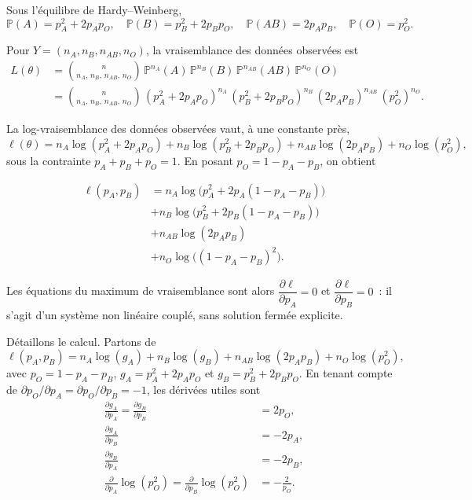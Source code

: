 \begin{exemple}
Sous l'équilibre de Hardy--Weinberg,
$$
\mathbb{P}(A) = p_A^2 + 2 p_A p_O, \quad
\mathbb{P}(B) = p_B^2 + 2 p_B p_O, \quad
\mathbb{P}(AB) = 2 p_A p_B, \quad
\mathbb{P}(O) = p_O^2 .
$$

Pour $Y = (n_A, n_B, n_{AB}, n_O)$, la vraisemblance des données observées est
\begin{align*}
L(\theta)
&= \binom{n}{n_A,\, n_B,\, n_{AB},\, n_O}\,
   \mathbb{P}^{n_A}(A)\, \mathbb{P}^{n_B}(B)\,
   \mathbb{P}^{n_{AB}}(AB)\, \mathbb{P}^{n_O}(O) \\
&= \binom{n}{n_A,\, n_B,\, n_{AB},\, n_O}\,
   (p_A^2 + 2 p_A p_O)^{n_A}\,
   (p_B^2 + 2 p_B p_O)^{n_B}\,
   (2 p_A p_B)^{n_{AB}}\,
   (p_O^2)^{n_O} .
\end{align*}

La log-vraisemblance des données observées vaut, à une constante près,
$$
\ell(\theta) = n_A \log(p_A^2 + 2 p_A p_O)
             + n_B \log(p_B^2 + 2 p_B p_O)
             + n_{AB} \log(2 p_A p_B)
             + n_O \log(p_O^2),
$$
sous la contrainte $p_A + p_B + p_O = 1$. En posant $p_O = 1 - p_A - p_B$, on
obtient

\begin{align*}
\ell(p_A, p_B) &= n_A \log\!\big(p_A^2 + 2 p_A (1 - p_A - p_B)\big) \\
              &+ n_B \log\!\big(p_B^2 + 2 p_B (1 - p_A - p_B)\big) \\
              &+ n_{AB} \log(2 p_A p_B) \\
              &+ n_O \log\!\big((1 - p_A - p_B)^2\big).
\end{align*}

Les équations du maximum de vraisemblance sont alors
$\dfrac{\partial \ell}{\partial p_A} = 0$ et
$\dfrac{\partial \ell}{\partial p_B} = 0$~: il s'agit d'un système non linéaire
couplé, sans solution fermée explicite.

Détaillons le calcul. Partons de
$$
\ell(p_A, p_B) = n_A \log(g_A) + n_B \log(g_B)
               + n_{AB} \log(2 p_A p_B) + n_O \log(p_O^2),
$$
avec $p_O = 1 - p_A - p_B$, $g_A = p_A^2 + 2 p_A p_O$ et
$g_B = p_B^2 + 2 p_B p_O$. En tenant compte de
$\partial p_O / \partial p_A = \partial p_O / \partial p_B = -1$, les dérivées
utiles sont
\begin{align*}
\frac{\partial g_A}{\partial p_A}
  = \frac{\partial g_B}{\partial p_B} &= 2 p_O, \\
\frac{\partial g_A}{\partial p_B} &= -2 p_A, \\
\frac{\partial g_B}{\partial p_A} &= -2 p_B, \\
\frac{\partial}{\partial p_A} \log(p_O^2)
  = \frac{\partial}{\partial p_B} \log(p_O^2) &= -\frac{2}{p_O} .
\end{align*}


\end{exemple}
